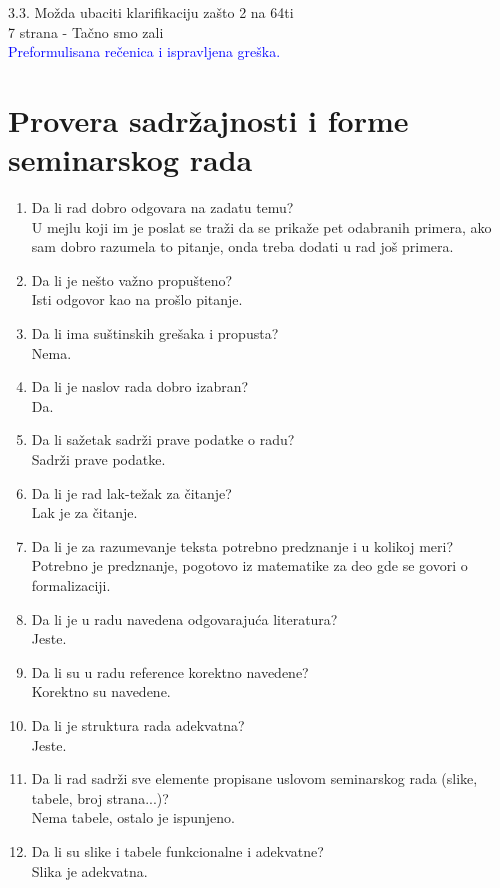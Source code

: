 \documentclass[a4paper]{report}
\newcommand{\odgovor}[1]{\textcolor{blue}{#1}}
\begin{document}
3.3. Možda ubaciti klarifikaciju zašto 2 na 64ti \\
7 strana - Tačno smo zali 
\\
\odgovor{Preformulisana rečenica i ispravljena greška.} \\
\section{Provera sadržajnosti i forme seminarskog rada}

\begin{enumerate}
\item Da li rad dobro odgovara na zadatu temu?\\
U mejlu koji im je poslat se traži  da se prikaže pet odabranih primera, ako sam dobro razumela to pitanje, onda treba dodati u rad još primera.   

\item Da li je nešto važno propušteno?\\
Isti odgovor kao na prošlo pitanje.

\item Da li ima suštinskih grešaka i propusta?\\
Nema.

\item Da li je naslov rada dobro izabran?\\
Da.

\item Da li sažetak sadrži prave podatke o radu?\\
Sadrži prave podatke.

\item Da li je rad lak-težak za čitanje?\\
Lak je za čitanje.

\item Da li je za razumevanje teksta potrebno predznanje i u kolikoj meri?\\
Potrebno je predznanje, pogotovo iz matematike za deo gde se govori o formalizaciji.

\item Da li je u radu navedena odgovarajuća literatura?\\
Jeste.

\item Da li su u radu reference korektno navedene?\\
Korektno su navedene.

\item Da li je struktura rada adekvatna?\\
Jeste.

\item Da li rad sadrži sve elemente propisane uslovom seminarskog rada (slike, tabele, broj strana...)?\\
Nema tabele, ostalo je ispunjeno.

\item Da li su slike i tabele funkcionalne i adekvatne?\\
Slika je adekvatna.
\end{enumerate}
\end{document}
